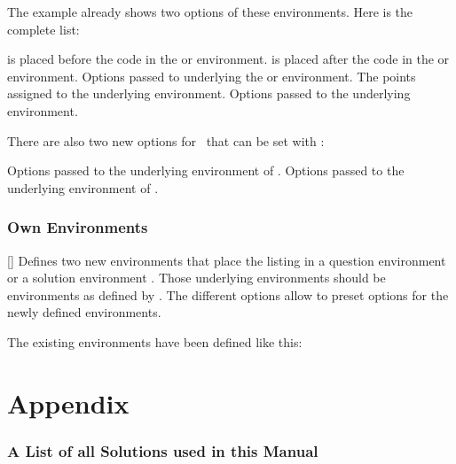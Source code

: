 \documentclass[load-preamble+,scrartcl={DIV10}]{cnltx-doc}
\begin{document}
The example already shows two options of these environments.  Here is the
complete list:
\begin{options}
     is placed before the code in the  or
     environment.
     is placed after the code in the  or
     environment.
    Options passed to underlying the  or 
    environment.
    The points assigned to the underlying  environment.
    Options passed to the underlying  environment.
\end{options}

There are also two new options for \ExSheets\ that can be set with
:
\begin{options}
    Options passed to the underlying  environment of
    .
    Options passed to the underlying  environment of
    .
\end{options}

\section{Own Environments}

\begin{commands}
  []
    Defines two new  environments that place the listing in a
    question environment  or a solution environment
    .  Those underlying environments should be
    environments as defined by .  The different options
    allow to preset options for the newly defined environments.
\end{commands}

The existing environments have been defined like this:
\begin{sourcecode}
\end{sourcecode}

\appendix
\part{Appendix}
\section{A List of all Solutions used in this Manual}\label{sec:solutions:list}
\printsolutions
\end{document}
